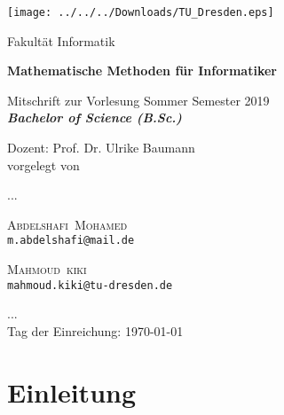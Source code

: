 \documentclass[a4paper,12pt,leqno]{report}
\makeatletter
\newcommand{\nameE}{Mohamed}
\newcommand{\vornameE}{Abdelshafi}
\newcommand{\emailE}{m.abdelshafi@mail.de}
\newcommand{\nameS}{kiki}
\newcommand{\vornameS}{Mahmoud}
\newcommand{\emailS}{mahmoud.kiki@tu-dresden.de}
\newcommand{\thema}{Mathematische Methoden für Informatiker}
\newcommand{\datum}{\today}
\theoremstyle{plain} %
\theoremstyle{definition} %
\makeatother
\begin{document}
	
	
	
	
	\thispagestyle{empty}
	
	\texttt{[image: ../../../Downloads/TU\_Dresden.eps]} 

	\begin{center}
		{\Large
			 Fakult\"{a}t Informatik
		}
		
		\vfil
		
		{\bfseries\Huge\thema}
		
		\vfil
		
		{\LARGE
			Mitschrift zur Vorlesung Sommer Semester 2019 \\[\bigskipamount]

			\bfseries{\itshape Bachelor of Science  \textup{(}B.Sc.\textup{)}}\\[\bigskipamount]
		}%
		
		\vfil\vfil\vfil
		Dozent: Prof. Dr. Ulrike Baumann \\
		vorgelegt von\\ 
		\item ... \\
		\item \textsc{\vornameE\ \nameE } \\ \texttt{\emailE} \\  \item 
		\textsc{\vornameS\ \nameS \qquad } \\ \texttt{\emailS}  \\ 
		\item ... \\
		Tag der Einreichung: \datum\\[\bigskipamount]

	\end{center}


\cleardoublepage



\tableofcontents

\thispagestyle{empty}

	
	
\setcounter{page}{0}
\chapter*{Einleitung}
\end{document}
